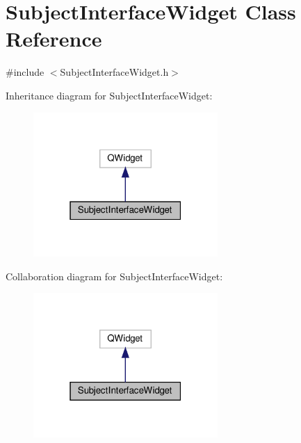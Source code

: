 \hypertarget{class_subject_interface_widget}{}\section{Subject\+Interface\+Widget Class Reference}
\label{class_subject_interface_widget}


{\ttfamily \#include $<$Subject\+Interface\+Widget.\+h$>$}



Inheritance diagram for Subject\+Interface\+Widget\+:
\nopagebreak
\begin{figure}[H]
\begin{center}
\leavevmode
\includegraphics[width=199pt]{class_subject_interface_widget__inherit__graph}
\end{center}
\end{figure}


Collaboration diagram for Subject\+Interface\+Widget\+:
\nopagebreak
\begin{figure}[H]
\begin{center}
\leavevmode
\includegraphics[width=199pt]{class_subject_interface_widget__coll__graph}
\end{center}
\end{figure}
